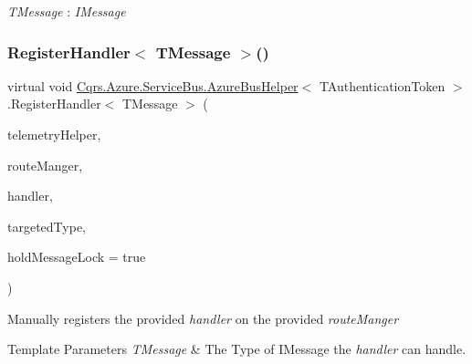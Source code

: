\begin{Desc}
\item[Type Constraints]\begin{description}
\item[{\em T\+Message} : {\em I\+Message}]\end{description}
\end{Desc}
\mbox{\label{classCqrs_1_1Azure_1_1ServiceBus_1_1AzureBusHelper_a3b8dd8410756ffdc67782dde8f2519ff_a3b8dd8410756ffdc67782dde8f2519ff}} 
\subsubsection{\texorpdfstring{Register\+Handler$<$ T\+Message $>$()}{RegisterHandler< TMessage >()}}
{\footnotesize\ttfamily virtual void \hyperlink{classCqrs_1_1Azure_1_1ServiceBus_1_1AzureBusHelper}{Cqrs.\+Azure.\+Service\+Bus.\+Azure\+Bus\+Helper}$<$ T\+Authentication\+Token $>$.Register\+Handler$<$ T\+Message $>$ (\begin{DoxyParamCaption}\item[{I\+Telemetry\+Helper}]{telemetry\+Helper,  }\item[{\hyperlink{classCqrs_1_1Bus_1_1RouteManager}{Route\+Manager}}]{route\+Manger,  }\item[{Action$<$ T\+Message $>$}]{handler,  }\item[{Type}]{targeted\+Type,  }\item[{bool}]{hold\+Message\+Lock = {\ttfamily true} }\end{DoxyParamCaption})\hspace{0.3cm}{\ttfamily [virtual]}}



Manually registers the provided {\itshape handler}  on the provided {\itshape route\+Manger}  


\begin{DoxyTemplParams}{Template Parameters}
{\em T\+Message} & The Type of I\+Message the {\itshape handler}  can handle.\\
\hline
\end{DoxyTemplParams}


